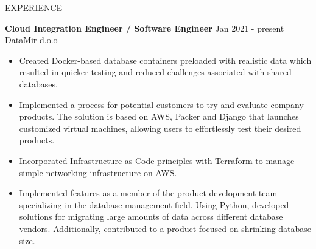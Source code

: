 \documentclass{resume} %
\begin{document}
\begin{rSection}{EXPERIENCE}

\textbf{Cloud Integration Engineer / Software Engineer} \hfill Jan 2021 - present\\
DataMir d.o.o \hfill
 \begin{itemize}
    \itemsep -3pt {} 
     \item Created Docker-based database containers preloaded with realistic data which resulted in quicker testing and reduced challenges associated with shared databases.
    \item Implemented a process for potential customers to try and evaluate company products. The solution is based on AWS, Packer and Django that launches customized virtual machines, allowing users to effortlessly test their desired products.   
    \item Incorporated Infrastructure as Code principles with Terraform to manage simple networking infrastructure on AWS.
    \item Implemented features as a member of the product development team specializing in the database management field. Using Python, developed solutions for migrating large amounts of data across different database vendors. Additionally, contributed to a product focused on shrinking database size.
 \end{itemize}
 
\end{rSection} 

\end{document}
